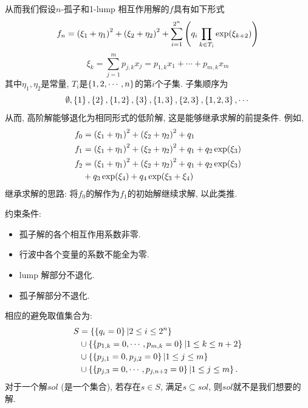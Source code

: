 \begin{frame}
\small 
从而我们假设$n$-孤子和1-lump 相互作用解的$f$具有如下形式 
\[
    f_n=\left(\xi_1+\eta_1\right)^2+\left(\xi_2+\eta_2\right)^2+\sum_{i=1}^{2^n}\left(q_i\prod_{k \in T_i}{\exp(\xi_{k+2})}\right)
\]
\[
    \xi_k=\sum_{j=1}^m{p_{j,k}x_j}=p_{1,k}x_1+\cdots+p_{m,k}x_m
\]
其中$\eta_1,\eta_2$是常量, $T_i$是$\left\{1,2,\cdots,n\right\}$的第$i$个子集. 子集顺序为
\[
    \emptyset,\left\{1\right\},\left\{2\right\},\left\{1,2\right\},\left\{3\right\},\left\{1,3\right\},\left\{2,3\right\},\left\{1,2,3\right\},\cdots 
\]
从而, 高阶解能够退化为相同形式的低阶解, 这是能够继承求解的前提条件. 例如, 
\[
\begin{aligned}
    f_0 &= \left(\xi_1+\eta_1\right)^2+\left(\xi_2+\eta_2\right)^2+q_1\\ 
    f_1 &= \left(\xi_1+\eta_1\right)^2+\left(\xi_2+\eta_2\right)^2+q_1+q_2 \exp(\xi_3) \\ 
    f_2 &= \left(\xi_1+\eta_1\right)^2+\left(\xi_2+\eta_2\right)^2+q_1+q_2 \exp(\xi_3) \\
        & +q_3 \exp(\xi_4) + q_4 \exp(\xi_3+\xi_4)
\end{aligned}
\]
继承求解的思路: 将$f_0$的解作为$f_1$的初始解继续求解, 以此类推.
\end{frame}

\begin{frame}
约束条件:
\begin{itemize}
\item 孤子解的各个相互作用系数非零.
\item 行波中各个变量的系数不能全为零. 
\item lump 解部分不退化.
\item 孤子解部分不退化. 
\end{itemize}
相应的避免取值集合为: 
\[
\begin{aligned}
    S&=\left\{\left\{q_i=0\right\}|2\le i \le 2^n\right\} \\ 
        &\cup \left\{\left\{p_{1,k}=0,\cdots,p_{m,k}=0\right\}|1\le k \le n+2\right\}  \\
        &\cup \left\{\left\{p_{j,1}=0,p_{j,2}=0\right\}|1\le j \le m\right\} \\ 
        &\cup \left\{\left\{p_{j,3}=0,\cdots,p_{j,n+2}=0\right\}|1\le j \le m\right\} .  
\end{aligned}
\]
对于一个解$sol$ (是一个集合), 若存在$s\in S$, 满足$s\subseteq sol$, 则$sol$就不是我们想要的解.
\end{frame}



